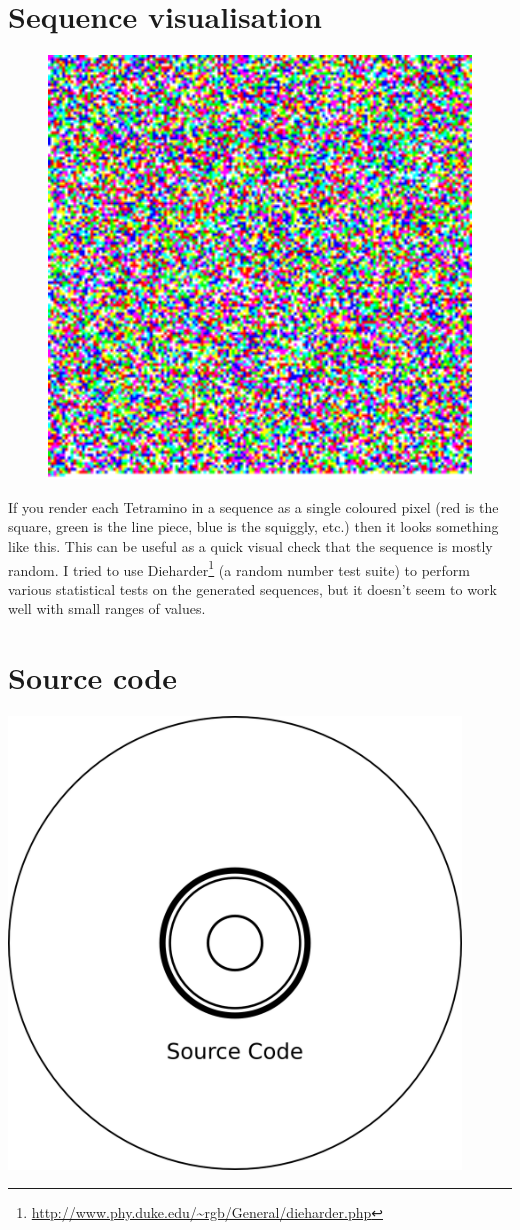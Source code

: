 \documentclass[a4paper,11pt]{article}
\begin{document}
\section{Sequence visualisation}

\begin{figure}[h]
  \label{Sequence}
  \centering
  \includegraphics[width=13cm]{results/sequence.png}
\end{figure}

If you render each Tetramino in a sequence as a single coloured
pixel (red is the square, green is the line piece, blue is the squiggly,
etc.) then it looks something like this.
This can be useful as a quick visual check that the sequence is mostly
random.
I tried to use Dieharder\footnote{\url{http://www.phy.duke.edu/~rgb/General/dieharder.php}}
(a random number test suite) to perform various statistical tests on the
generated sequences, but it doesn't seem to work well with small ranges of
values.

\section{Source code}
\begin{center}
 \includegraphics[width=12cm,height=12cm]{cd.png}
\end{center}
\end{document}
